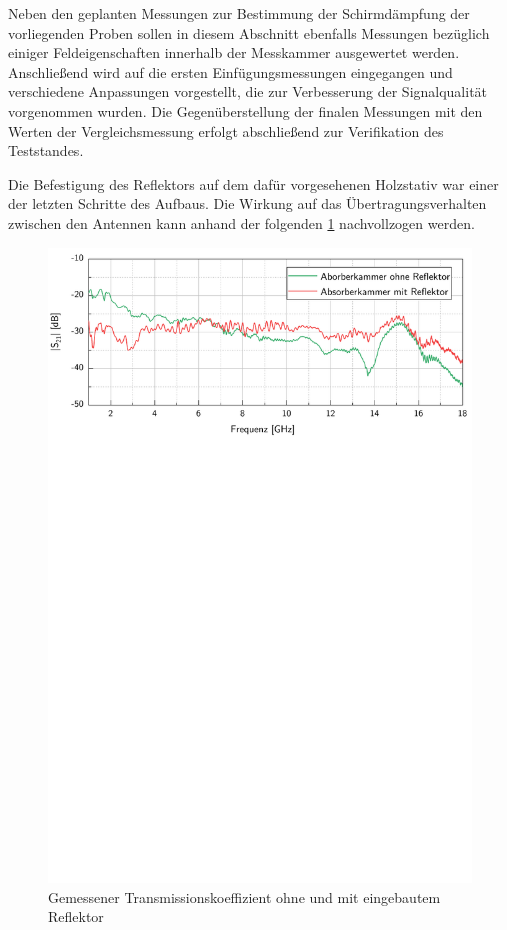 

Neben den geplanten Messungen zur Bestimmung der Schirmdämpfung der vorliegenden Proben sollen in diesem Abschnitt ebenfalls Messungen bezüglich einiger Feldeigenschaften innerhalb der Messkammer ausgewertet werden. Anschließend wird auf die ersten Einfügungsmessungen eingegangen und verschiedene Anpassungen vorgestellt, die zur Verbesserung der Signalqualität vorgenommen wurden. Die Gegenüberstellung der finalen Messungen mit den Werten der Vergleichsmessung erfolgt abschließend zur Verifikation des Teststandes.
\par
\vspace{\linespace}
Die Befestigung des Reflektors auf dem dafür vorgesehenen Holzstativ war einer der letzten Schritte des Aufbaus. Die Wirkung auf das Übertragungsverhalten zwischen den Antennen kann anhand der folgenden \Abb\ref{fig:4_Vergleich_Reflektor} nachvollzogen werden.
\par
\vspace{\linespace}


\begin{figure}[ht]
    \centering
    \includegraphics[page=1, width = .99\textwidth, trim = 0cm 17.4cm 0cm 0cm, clip]{Abbildungen/Kapitel4/Messergebnisse/Vergleich mit und ohne Reflektor (geerdet).pdf}
    \caption{Gemessener Transmissionskoeffizient ohne und mit eingebautem Reflektor}
    \label{fig:4_Vergleich_Reflektor}
\end{figure}

